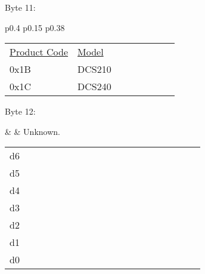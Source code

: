 Byte 11:

\begin{tabular}{p{0.4\linewidth} p{0.15\linewidth} p{0.38\linewidth}} 

\begin{tabular}{|p{0.3cm}|p{0.3cm}|p{0.3cm}|p{0.3cm}|p{0.3cm}|p{0.3cm}|p{0.3cm}|p{0.3cm}|}
\hline
0 & n & n & n & n & n & n & n\\
\hline
\end{tabular}
& $<$CSM$>$ & Product code.\\
\end{tabular}

\begin{tabular}{p{0.2\linewidth} p{0.6\linewidth}} 
\underline{Product Code} & \underline{Model}\\
0x1B & DCS210\\
0x1C & DCS240\\
\end{tabular}

Byte 12:

&  & Unknown.\\
\end{tabular}

\begin{tabular}{p{0.05\linewidth} p{0.6\linewidth}} 
d6 & \\
d5 & \\
d4 & \\
d3 & \\
d2 & \\
d1 & \\
d0 & \\
\end{tabular}


